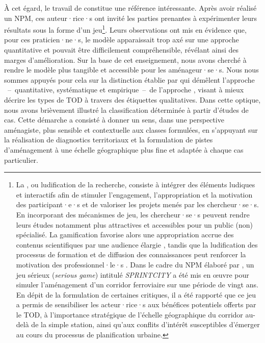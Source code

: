 \begin{refsegment}
À cet égard, le travail de \textcolor{blue}{\textcite[784]{duffhues_breaking_2014}} constitue une référence intéressante. Après avoir réalisé un \acrshort{NPM}, ces auteur·rice·s ont invité les parties prenantes à expérimenter leurs résultats sous la forme d’un jeu\footnote{
    La , ou ludification de la recherche, consiste à intégrer des éléments ludiques et interactifs afin de stimuler l'engagement, l'appropriation et la motivation des participant·e·s et de valoriser les projets menés par les chercheur·se·s. En incorporant des mécanismes de jeu, les chercheur·se·s peuvent rendre leurs études notamment plus attractives et accessibles pour un public (non) spécialisé. La gamification favorise alors une appropriation accrue des contenus scientifiques par une audience élargie \textcolor{blue}{\autocite[6]{genvo_approche_2014}}, tandis que la ludification des processus de formation et de diffusion des connaissances peut renforcer la motivation des professionnel·le·s \textcolor{blue}{\autocite[36, 62]{lu_gamification_2023}}. Dans le cadre du \acrshort{NPM} élaboré par \textcolor{blue}{\textcite[784]{duffhues_breaking_2014}}, un jeu sérieux (\textsl{serious game}) intitulé \textsl{SPRINTCITY} a été mis en œuvre pour simuler l'aménagement d'un corridor ferroviaire sur une période de vingt ans. En dépit de la formulation de certaines critiques, il a été rapporté que ce jeu a permis de sensibiliser les acteur·rice·s aux bénéfices potentiels offerts par le \acrshort{TOD}, à l'importance stratégique de l'échelle géographique du corridor au-delà de la simple station, ainsi qu'aux conflits d'intérêt susceptibles d'émerger au cours du processus de planification urbaine.
}. Leurs observations ont mis en évidence que, pour ces praticien·ne·s, le modèle apparaissait trop axé sur une approche quantitative et pouvait être difficilement compréhensible, révélant ainsi des marges d’amélioration. Sur la base de cet enseignement, nous avons cherché à rendre le modèle plus tangible et accessible pour les aménageur·se·s. Nous nous sommes appuyés pour cela sur la distinction établie par \textcolor{blue}{\textcite[499]{higgins_forty_2016}} qui démêlent l’approche ~–~quantitative, systématique et empirique~–~de l’approche , visant à mieux décrire les types de \acrshort{TOD} à travers des étiquettes qualitatives. Dans cette optique, nous avons brièvement illustré la classification déterminée à partir d’études de cas. Cette démarche a consisté à donner un sens, dans une perspective aménagiste, plus sensible et contextuelle aux classes formulées, en s’appuyant sur la réalisation de diagnostics territoriaux et la formulation de pistes d’aménagement à une échelle géographique plus fine et adaptée à chaque cas particulier.%


\end{refsegment}
